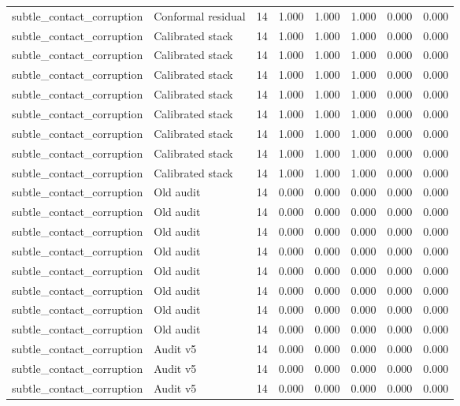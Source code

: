 {\begin{longtable}{llrrrrrr}
subtle\_contact\_corruption & Conformal residual & 14 & 1.000 & 1.000 & 1.000 & 0.000 & 0.000 \\
subtle\_contact\_corruption & Calibrated stack & 14 & 1.000 & 1.000 & 1.000 & 0.000 & 0.000 \\
subtle\_contact\_corruption & Calibrated stack & 14 & 1.000 & 1.000 & 1.000 & 0.000 & 0.000 \\
subtle\_contact\_corruption & Calibrated stack & 14 & 1.000 & 1.000 & 1.000 & 0.000 & 0.000 \\
subtle\_contact\_corruption & Calibrated stack & 14 & 1.000 & 1.000 & 1.000 & 0.000 & 0.000 \\
subtle\_contact\_corruption & Calibrated stack & 14 & 1.000 & 1.000 & 1.000 & 0.000 & 0.000 \\
subtle\_contact\_corruption & Calibrated stack & 14 & 1.000 & 1.000 & 1.000 & 0.000 & 0.000 \\
subtle\_contact\_corruption & Calibrated stack & 14 & 1.000 & 1.000 & 1.000 & 0.000 & 0.000 \\
subtle\_contact\_corruption & Calibrated stack & 14 & 1.000 & 1.000 & 1.000 & 0.000 & 0.000 \\
subtle\_contact\_corruption & Old audit & 14 & 0.000 & 0.000 & 0.000 & 0.000 & 0.000 \\
subtle\_contact\_corruption & Old audit & 14 & 0.000 & 0.000 & 0.000 & 0.000 & 0.000 \\
subtle\_contact\_corruption & Old audit & 14 & 0.000 & 0.000 & 0.000 & 0.000 & 0.000 \\
subtle\_contact\_corruption & Old audit & 14 & 0.000 & 0.000 & 0.000 & 0.000 & 0.000 \\
subtle\_contact\_corruption & Old audit & 14 & 0.000 & 0.000 & 0.000 & 0.000 & 0.000 \\
subtle\_contact\_corruption & Old audit & 14 & 0.000 & 0.000 & 0.000 & 0.000 & 0.000 \\
subtle\_contact\_corruption & Old audit & 14 & 0.000 & 0.000 & 0.000 & 0.000 & 0.000 \\
subtle\_contact\_corruption & Old audit & 14 & 0.000 & 0.000 & 0.000 & 0.000 & 0.000 \\
subtle\_contact\_corruption & Audit v5 & 14 & 0.000 & 0.000 & 0.000 & 0.000 & 0.000 \\
subtle\_contact\_corruption & Audit v5 & 14 & 0.000 & 0.000 & 0.000 & 0.000 & 0.000 \\
subtle\_contact\_corruption & Audit v5 & 14 & 0.000 & 0.000 & 0.000 & 0.000 & 0.000 \\

\end{longtable}}
